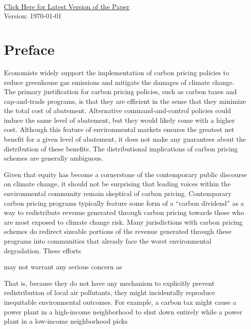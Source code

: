 ~

\newpage

\begin{center}
	\Large \href{https://github.com/EAPerry/seniorThesis/raw/main/Writing/Draft/main.pdf}{Click Here for Latest Version of the Paper}\\
	\normalsize Version: \today
\end{center}


\section*{Preface}

Economists widely support the implementation of carbon pricing policies to reduce greenhouse gas emissions and mitigate the damages of climate change. The primary justification for carbon pricing policies, such as carbon taxes and cap-and-trade programs, is that they are efficient in the sense that they minimize the total cost of abatement. Alternative command-and-control policies could induce the same level of abatement, but they would likely come with a higher cost. Although this feature of environmental markets ensures the greatest net benefit for a given level of abatement, it does not make any guarantees about the distribution of these benefits. The distributional implications of carbon pricing schemes are generally ambiguous. 

Given that equity has become a cornerstone of the contemporary public discourse on climate change, it should not be surprising that leading voices within the environmental community remain skeptical of carbon pricing. Contemporary carbon pricing programs typically feature some form of a ``carbon dividend'' as a way to redistribute revenue generated through carbon pricing towards those who are most exposed to climate change risk. Many jurisdictions with carbon pricing schemes do redirect sizeable portions of the revenue generated through these programs into communities that already face the worst environmental degradation. These efforts 


may not warrant any serious concern as 



That is, because they do not have any mechanism to explicitly prevent redistribution of local air pollutants, they might incidentally reproduce inequitable environmental outcomes. For example, a carbon tax might cause a power plant in a high-income neighborhood to shut down entirely while a power plant in a low-income neighborhood picks


